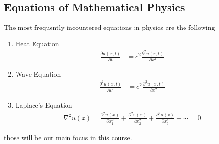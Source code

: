 \documentclass[]{article}
\begin{document}
\subsection*{Equations of Mathematical Physics}
The most frequently incountered equations in physics are the following
\begin{enumerate}
\item Heat Equation
\begin{align*}
\frac{\partial u(x,t)}{\partial t}  &= c^2 \frac{\partial^2 u(x,t)}{\partial x^2}
\end{align*}

\item Wave Equation 
\begin{align*}
\frac{\partial^2 u(x,t)}{\partial t^2}  &= c^2 \frac{\partial^2 u(x,t)}{\partial x^2}
\end{align*}

\item Laplace's Equation
\begin{align*}
\nabla^2 u(x) = \frac{\partial^2 u(x)}{\partial x^{2}_{1}} + \frac{\partial^2 u(x)}{\partial x^{2}_{2}} + \frac{\partial^2 u(x)}{\partial x^{2}_{3}} + \cdots = 0
\end{align*}
\end{enumerate}

those will be our main focus in this course.
\\
\end{document}
